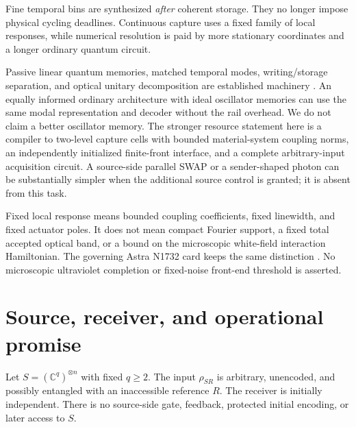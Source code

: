 \documentclass[11pt,a4paper]{article}
\begin{document}
Fine temporal bins are synthesized \emph{after} coherent storage. They no longer impose physical cycling deadlines. Continuous capture uses a fixed family of local responses, while numerical resolution is paid by more stationary coordinates and a longer ordinary quantum circuit.

Passive linear quantum memories, matched temporal modes, writing/storage separation, and optical unitary decomposition are established machinery \cite{yamamoto,nurdin,reck}. An equally informed ordinary architecture with ideal oscillator memories can use the same modal representation and decoder without the rail overhead. We do not claim a better oscillator memory. The stronger resource statement here is a compiler to two-level capture cells with bounded material-system coupling norms, an independently initialized finite-front interface, and a complete arbitrary-input acquisition circuit. A source-side parallel SWAP or a sender-shaped photon can be substantially simpler when the additional source control is granted; it is absent from this task.

Fixed local response means bounded coupling coefficients, fixed linewidth, and fixed actuator poles. It does not mean compact Fourier support, a fixed total accepted optical band, or a bound on the microscopic white-field interaction Hamiltonian. The governing Astra N1732 card keeps the same distinction \cite{astra1732}. No microscopic ultraviolet completion or fixed-noise front-end threshold is asserted.

\section{Source, receiver, and operational promise}
\label{sec:contract}

Let $S=(\mathbb C^q)^{\otimes n}$ with fixed $q\ge2$. The input $\rho_{SR}$ is arbitrary, unencoded, and possibly entangled with an inaccessible reference $R$. The receiver is initially independent. There is no source-side gate, feedback, protected initial encoding, or later access to $S$.
\end{document}
